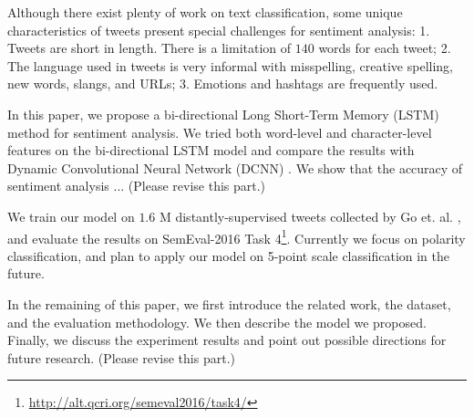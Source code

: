 \documentclass{article} %
\begin{document}
Although there exist plenty of work on text classification, some unique characteristics of tweets present special challenges for sentiment analysis:
1. Tweets are short in length. There is a limitation of $140$ words for each tweet; 2. The language used in tweets is very informal with misspelling, creative spelling,  new words, slangs, and URLs; 3. Emotions and hashtags are frequently used.

In this paper, we propose a bi-directional Long Short-Term Memory (LSTM) method for sentiment analysis. We tried both word-level and character-level features on the bi-directional LSTM model and compare the results with Dynamic Convolutional Neural Network (DCNN) \cite{kalchbrenner2014convolutional}.
We show that the accuracy of sentiment analysis ... (Please revise this part.)

We train our model on $1.6$ M distantly-supervised tweets collected by Go et. al. \cite{go2009twitter}, and evaluate the results on SemEval-2016 Task 4\footnote{\url{http://alt.qcri.org/semeval2016/task4/}}. Currently we focus on polarity classification, and plan to apply our model on 5-point scale classification in the future. 

In the remaining of this paper, we first introduce the related work, the dataset, and the evaluation methodology. We then describe the model we proposed. Finally, we discuss the experiment results and point out possible directions for future research. (Please revise this part.)
\end{document}
